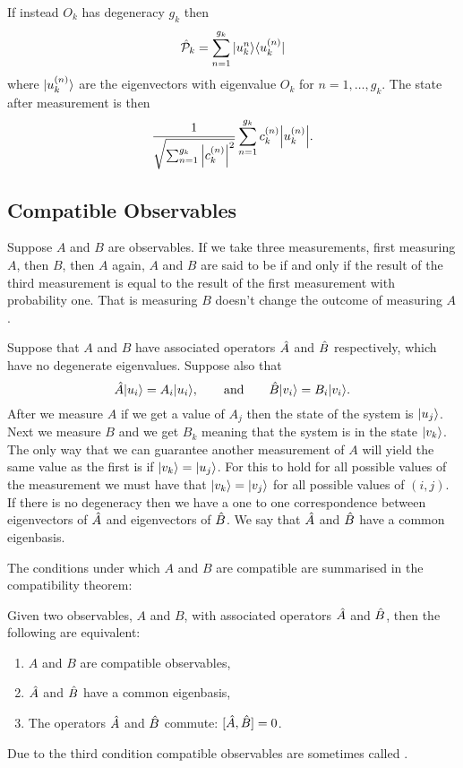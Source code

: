     If instead \(O_k\) has degeneracy \(g_k\) then
    \[\hat{\mathcal{P}}_k = \sum_{n=1}^{g_k} \vert {u_k^{n}}\rangle\langle {u_k^{(n)}} \vert\]
    where \(\vert {u_k^{(n)}} \rangle\) are the eigenvectors with eigenvalue \(O_k\) for \(n = 1, \dotsc, g_k\).
    The state after measurement is then
    \[\frac{1}{\sqrt{\sum_{n=1}^{g_k}\abs{c_k^{(n)}}^2}} \sum_{n=1}^{g_k}c_k^{(n)} \abs{u_k^{(n)}}.\]
    
    \subsection{Compatible Observables}
    Suppose \(A\) and \(B\) are observables.
    If we take three measurements, first measuring \(A\), then \(B\), then \(A\) again, \(A\) and \(B\) are said to be  if and only if the result of the third measurement is equal to the result of the first measurement with probability one.
    That is measuring \(B\) doesn't change the outcome of measuring \(A\).
    
    Suppose that \(A\) and \(B\) have associated operators \(\hat{A}\) and \(\hat{B}\) respectively, which have no degenerate eigenvalues.
    Suppose also that
    \[\hat{A}\vert {u_i} \rangle = A_i\vert {u_i} \rangle, \qquad\text{and}\qquad \hat{B}\vert {v_i} \rangle = B_i\vert {v_i} \rangle.\]
    After we measure \(A\) if we get a value of \(A_j\) then the state of the system is \(\vert {u_j} \rangle\).
    Next we measure \(B\) and we get \(B_k\) meaning that the system is in the state \(\vert {v_k} \rangle\).
    The only way that we can guarantee another measurement of \(A\) will yield the same value as the first is if \(\vert {v_k} \rangle = \vert {u_j} \rangle\).
    For this to hold for all possible values of the measurement we must have that \(\vert {v_k} \rangle = \vert {v_j} \rangle\) for all possible values of \((i, j)\).
    If there is no degeneracy then we have a one to one correspondence between eigenvectors of \(\hat{A}\) and eigenvectors of \(\hat{B}\).
    We say that \(\hat{A}\) and \(\hat{B}\) have a common eigenbasis.
    
    The conditions under which \(A\) and \(B\) are compatible are summarised in the compatibility theorem:
    \begin{theorem}
        Given two observables, \(A\) and \(B\), with associated operators \(\hat{A}\) and \(\hat{B}\), then the following are equivalent:
        \begin{enumerate}
            \item \(A\) and \(B\) are compatible observables,
            \item \(\hat{A}\) and \(\hat{B}\) have a common eigenbasis,
            \item The operators \(\hat{A}\) and \(\hat{B}\) commute: \([\hat{A}, \hat{B}] = 0\).
        \end{enumerate}
    \end{theorem}
    Due to the third condition compatible observables are sometimes called .
    

